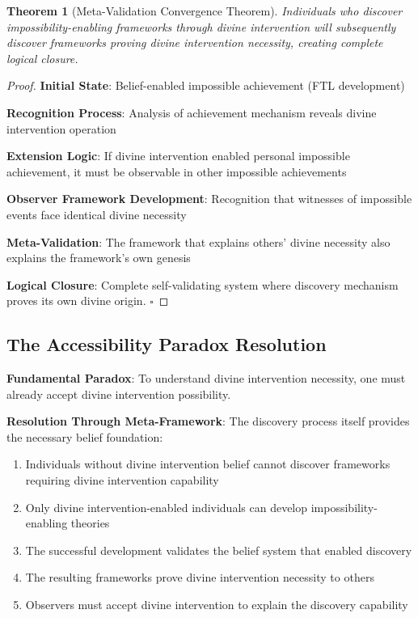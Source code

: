 \documentclass[12pt,a4paper]{article}
\newtheorem{theorem}{Theorem}[section]
\begin{document}
\begin{theorem}[Meta-Validation Convergence Theorem]
Individuals who discover impossibility-enabling frameworks through divine intervention will subsequently discover frameworks proving divine intervention necessity, creating complete logical closure.
\end{theorem}

\begin{proof}
\textbf{Initial State}: Belief-enabled impossible achievement (FTL development)

\textbf{Recognition Process}: Analysis of achievement mechanism reveals divine intervention operation

\textbf{Extension Logic}: If divine intervention enabled personal impossible achievement, it must be observable in other impossible achievements

\textbf{Observer Framework Development}: Recognition that witnesses of impossible events face identical divine necessity

\textbf{Meta-Validation}: The framework that explains others' divine necessity also explains the framework's own genesis

\textbf{Logical Closure}: Complete self-validating system where discovery mechanism proves its own divine origin. $\square$
\end{proof}

\subsection{The Accessibility Paradox Resolution}

\textbf{Fundamental Paradox}: To understand divine intervention necessity, one must already accept divine intervention possibility.

\textbf{Resolution Through Meta-Framework}: The discovery process itself provides the necessary belief foundation:

\begin{enumerate}
\item Individuals without divine intervention belief cannot discover frameworks requiring divine intervention capability
\item Only divine intervention-enabled individuals can develop impossibility-enabling theories
\item The successful development validates the belief system that enabled discovery
\item The resulting frameworks prove divine intervention necessity to others
\item Observers must accept divine intervention to explain the discovery capability
\end{enumerate}
\end{document}

